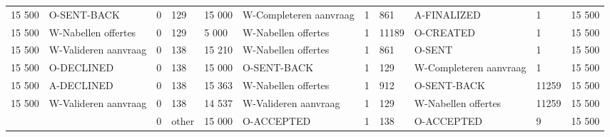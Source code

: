 \begin{tabular}{llllllllllr}
15 500 & O-SENT-BACK & 0 & 129 & 15 000 & W-Completeren aanvraag & 1 & 861 & A-FINALIZED & 1 & 15 500 \\
15 500 & W-Nabellen offertes & 0 & 129 & 5 000 & W-Nabellen offertes & 1 & 11189 & O-CREATED & 1 & 15 500 \\
15 500 & W-Valideren aanvraag & 0 & 138 & 15 210 & W-Nabellen offertes & 1 & 861 & O-SENT & 1 & 15 500 \\
15 500 & O-DECLINED & 0 & 138 & 15 000 & O-SENT-BACK & 1 & 129 & W-Completeren aanvraag & 1 & 15 500 \\
15 500 & A-DECLINED & 0 & 138 & 15 363 & W-Nabellen offertes & 1 & 912 & O-SENT-BACK & 11259 & 15 500 \\
15 500 & W-Valideren aanvraag & 0 & 138 & 14 537 & W-Valideren aanvraag & 1 & 129 & W-Nabellen offertes & 11259 & 15 500 \\
 &  & 0 & other & 15 000 & O-ACCEPTED & 1 & 138 & O-ACCEPTED & 9 & 15 500 \\
\bottomrule
\end{tabular}
